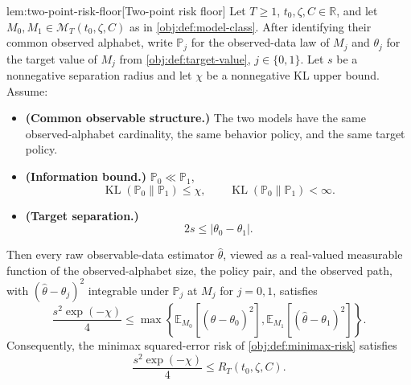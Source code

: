 \documentclass[11pt]{article}
\begin{document}
\begin{lemmav}{lem:two-point-risk-floor}[Two-point risk floor]
Let \(T\ge 1\), \(t_0,\zeta,C\in\mathbb R\), and let \(M_0,M_1\in\mathcal M_T(t_0,\zeta,C)\) as in \cref{obj:def:model-class}.  After identifying their common observed alphabet, write \(\mathbb P_j\) for the observed-data law of \(M_j\) and \(\theta_j\) for the target value of \(M_j\) from \cref{obj:def:target-value}, \(j\in\{0,1\}\).  Let \(s\) be a nonnegative separation radius and let \(\chi\) be a nonnegative KL upper bound.  Assume:
\begin{itemize}
\item \textbf{(Common observable structure.)} The two models have the same observed-alphabet cardinality, the same behavior policy, and the same target policy.
\item \textbf{(Information bound.)} \(\mathbb P_0\ll\mathbb P_1\),
\[
\operatorname{KL}(\mathbb P_0\|\mathbb P_1)\le \chi,
\qquad
\operatorname{KL}(\mathbb P_0\|\mathbb P_1)<\infty .
\]
\item \textbf{(Target separation.)}
\[
2s\le |\theta_0-\theta_1| .
\]
\end{itemize}
Then every raw observable-data estimator \(\widehat\theta\), viewed as a real-valued measurable function of the observed-alphabet size, the policy pair, and the observed path, with \((\widehat\theta-\theta_j)^2\) integrable under \(\mathbb P_j\) at \(M_j\) for \(j=0,1\), satisfies
\[
\frac{s^2\exp(-\chi)}{4}
\le
\max\left\{
\mathbb E_{M_0}\!\left[(\widehat\theta-\theta_0)^2\right],
\mathbb E_{M_1}\!\left[(\widehat\theta-\theta_1)^2\right]
\right\}.
\]
Consequently, the minimax squared-error risk of \cref{obj:def:minimax-risk} satisfies
\[
\frac{s^2\exp(-\chi)}{4}
\le
R_T(t_0,\zeta,C).
\]
\end{lemmav}
\end{document}

